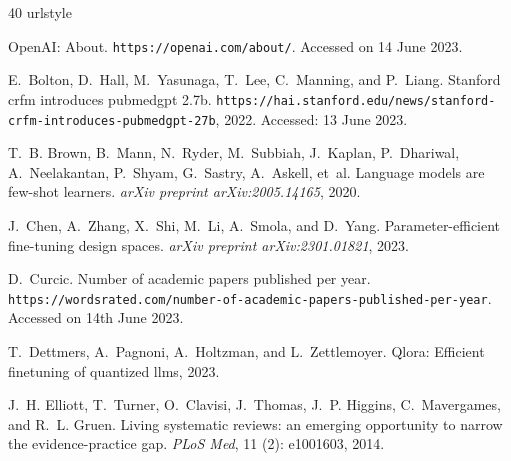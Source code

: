 \documentclass{article}
\begin{document}

%

\begin{thebibliography}{40}
\providecommand{\natexlab}[1]{#1}
\providecommand{\url}[1]{\texttt{#1}}
\expandafter\ifx\csname urlstyle\endcsname\relax
  \providecommand{\doi}[1]{doi: #1}\else
  \providecommand{\doi}{doi: \begingroup \urlstyle{rm}\Url}\fi

{OpenAI}: About.
\newblock \url{https://openai.com/about/}.
\newblock Accessed on 14 June 2023.

E.~Bolton, D.~Hall, M.~Yasunaga, T.~Lee, C.~Manning, and P.~Liang.
\newblock Stanford crfm introduces pubmedgpt 2.7b.
\newblock
  \url{https://hai.stanford.edu/news/stanford-crfm-introduces-pubmedgpt-27b},
  2022.
\newblock Accessed: 13 June 2023.

T.~B. Brown, B.~Mann, N.~Ryder, M.~Subbiah, J.~Kaplan, P.~Dhariwal,
  A.~Neelakantan, P.~Shyam, G.~Sastry, A.~Askell, et~al.
\newblock Language models are few-shot learners.
\newblock \emph{arXiv preprint arXiv:2005.14165}, 2020.

J.~Chen, A.~Zhang, X.~Shi, M.~Li, A.~Smola, and D.~Yang.
\newblock Parameter-efficient fine-tuning design spaces.
\newblock \emph{arXiv preprint arXiv:2301.01821}, 2023.

D.~Curcic.
\newblock Number of academic papers published per year.
\newblock
  \url{https://wordsrated.com/number-of-academic-papers-published-per-year}.
\newblock Accessed on 14th June 2023.

T.~Dettmers, A.~Pagnoni, A.~Holtzman, and L.~Zettlemoyer.
\newblock Qlora: Efficient finetuning of quantized llms, 2023.

J.~H. Elliott, T.~Turner, O.~Clavisi, J.~Thomas, J.~P. Higgins, C.~Mavergames,
  and R.~L. Gruen.
\newblock Living systematic reviews: an emerging opportunity to narrow the
  evidence-practice gap.
\newblock \emph{PLoS Med}, 11 (2): e1001603, 2014.


\end{thebibliography}
\end{document}
